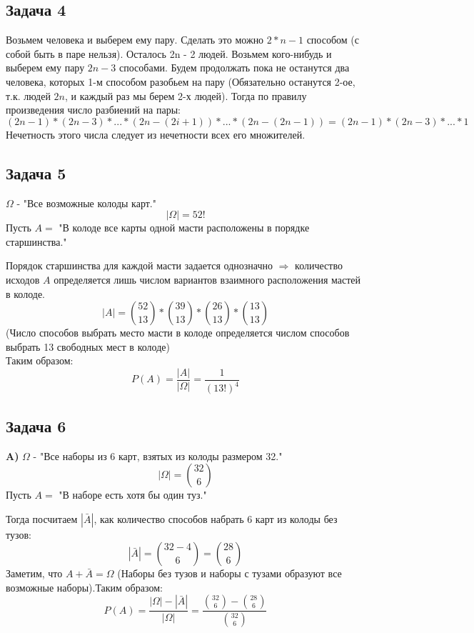 \documentclass{article}
\begin{document}
\newpage

\begin{center}
	\subsection*{Задача 4}
\end{center} 

Возьмем человека и выберем ему пару. Сделать это можно $ 2 * n - 1 $ способом (с собой быть в паре нельзя). Осталось 2n - 2 людей.
Возьмем кого-нибудь и выберем ему пару $ 2n - 3 $ способами. Будем продолжать пока не останутся два человека, которых 1-м способом разобьем на пару (Обязательно останутся 2-ое, т.к. людей $ 2n $, и каждый раз мы берем 2-х людей). Тогда по правилу произведения число разбиений на пары:
$$ (2n - 1) * (2n - 3) * ... * (2n - (2i + 1)) * ... * (2n - (2n - 1)) = (2n - 1) * (2n - 3) * ...  * 1 $$
Нечетность этого числа следует из нечетности всех его множителей. 
\\
\begin{center}
	\subsection*{Задача 5}
\end{center} 

$ \Omega $ - "Все возможные колоды карт."
$$ |\Omega| = 52! $$
Пусть $A = $ "В колоде все карты одной масти расположены в порядке старшинства."

Порядок старшинства для каждой масти задается однозначно $ \Rightarrow $ количество исходов  $A$ определяется лишь числом вариантов взаимного расположения мастей в колоде. 
$$  |A| = {52 \choose 13} * {39 \choose 13} * {26 \choose 13} * {13 \choose 13} $$
(Число способов выбрать место масти в колоде определяется числом способов выбрать 13 свободных мест в колоде)\\Таким образом:
$$ P(A) = \frac{|A|}{|\Omega|} = \frac{1}{(13!) ^ 4}$$ 

\begin{center}
	\subsection*{Задача 6}
\end{center} 

\textbf{A)} $ \Omega $ - "Все наборы из 6 карт, взятых из колоды размером 32."
$$ |\Omega| = {32 \choose 6} $$
Пусть $A = $ "В наборе есть хотя бы один туз."

Тогда посчитаем $|\bar{A}|$, как количество способов набрать 6 карт из колоды без тузов:
$$|\bar{A}| = {32 - 4 \choose 6} = {28 \choose 6}$$
Заметим, что $ A + \bar{A} = \Omega $ (Наборы без тузов и наборы с тузами образуют все возможные наборы).Таким образом:
$$ P(A) = \frac{|\Omega| - |\bar{A}|}{|\Omega|} = \frac{{32 \choose 6} - {28 \choose 6}}{{32 \choose 6}}$$ 
\end{document}
